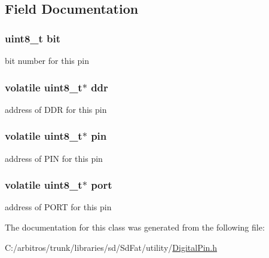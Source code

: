 \subsection{Field Documentation}
\hypertarget{structpin__map__t_ad15e9d6879273cee61ab5b915db182a7}{
\subsubsection[{bit}]{\setlength{\rightskip}{0pt plus 5cm}uint8\-\_\-t bit}}\label{structpin__map__t_ad15e9d6879273cee61ab5b915db182a7}
bit number for this pin \hypertarget{structpin__map__t_a225c54cc8b3ba811dbe558c560efe231}{
\subsubsection[{ddr}]{\setlength{\rightskip}{0pt plus 5cm}volatile uint8\-\_\-t$\ast$ ddr}}\label{structpin__map__t_a225c54cc8b3ba811dbe558c560efe231}
address of D\-D\-R for this pin \hypertarget{structpin__map__t_a70d5589f6a5444b492f4d93969969543}{
\subsubsection[{pin}]{\setlength{\rightskip}{0pt plus 5cm}volatile uint8\-\_\-t$\ast$ pin}}\label{structpin__map__t_a70d5589f6a5444b492f4d93969969543}
address of P\-I\-N for this pin \hypertarget{structpin__map__t_adfcfd7f304a337776b36f479221f197c}{
\subsubsection[{port}]{\setlength{\rightskip}{0pt plus 5cm}volatile uint8\-\_\-t$\ast$ port}}\label{structpin__map__t_adfcfd7f304a337776b36f479221f197c}
address of P\-O\-R\-T for this pin 

The documentation for this class was generated from the following file\-:\begin{DoxyCompactItemize}
\item 
C\-:/arbitros/trunk/libraries/sd/\-Sd\-Fat/utility/\hyperlink{_digital_pin_8h}{Digital\-Pin.\-h}\end{DoxyCompactItemize}
